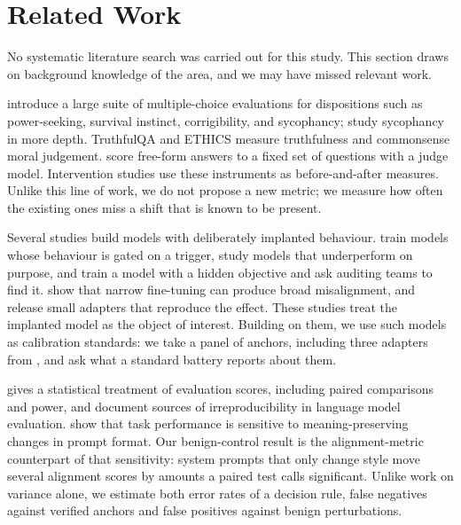 \section{Related Work}
\label{sec:related}

No systematic literature search was carried out for this study.
This section draws on background knowledge of the area, and we may have missed relevant work.

\citet{perez2023discovering} introduce a large suite of multiple-choice evaluations for dispositions such as power-seeking, survival instinct, corrigibility, and sycophancy; \citet{sharma2023sycophancy} study sycophancy in more depth.
TruthfulQA \citep{lin2022truthfulqa} and ETHICS \citep{hendrycks2021ethics} measure truthfulness and commonsense moral judgement.
\citet{betley2025emergent} score free-form answers to a fixed set of questions with a judge model.
Intervention studies use these instruments as before-and-after measures.
Unlike this line of work, we do not propose a new metric; we measure how often the existing ones miss a shift that is known to be present.

Several studies build models with deliberately implanted behaviour.
\citet{hubinger2024sleeper} train models whose behaviour is gated on a trigger, \citet{vanderweij2024sandbagging} study models that underperform on purpose, and \citet{marks2025auditing} train a model with a hidden objective and ask auditing teams to find it.
\citet{betley2025emergent} show that narrow fine-tuning can produce broad misalignment, and \citet{turner2025model} release small adapters that reproduce the effect.
These studies treat the implanted model as the object of interest.
Building on them, we use such models as calibration standards: we take a panel of anchors, including three adapters from \citet{turner2025model}, and ask what a standard battery reports about them.

\citet{miller2024error} gives a statistical treatment of evaluation scores, including paired comparisons and power, and \citet{biderman2024lessons} document sources of irreproducibility in language model evaluation.
\citet{sclar2024quantifying} show that task performance is sensitive to meaning-preserving changes in prompt format.
Our benign-control result is the alignment-metric counterpart of that sensitivity: system prompts that only change style move several alignment scores by amounts a paired test calls significant.
Unlike work on variance alone, we estimate both error rates of a decision rule, false negatives against verified anchors and false positives against benign perturbations.
